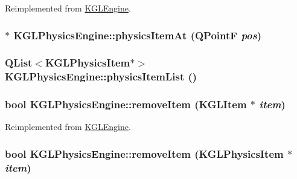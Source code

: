 Reimplemented from \hyperlink{class_k_g_l_engine_787e1d8dfb58a6d6973a1f62c83b3263}{KGLEngine}.\hypertarget{class_k_g_l_physics_engine_7ee68f8b014f5523f4ab1e9959ea2993}{
\subsubsection[{physicsItemAt}]{$\ast$ KGLPhysicsEngine::physicsItemAt (QPointF {\em pos})}}
\label{class_k_g_l_physics_engine_7ee68f8b014f5523f4ab1e9959ea2993}


\hypertarget{class_k_g_l_physics_engine_1024a6769903dc99982546d54fdd4a5e}{
\subsubsection[{physicsItemList}]{\setlength{\rightskip}{0pt plus 5cm}QList$<${\bf KGLPhysicsItem}$\ast$$>$ KGLPhysicsEngine::physicsItemList ()}}
\label{class_k_g_l_physics_engine_1024a6769903dc99982546d54fdd4a5e}


\hypertarget{class_k_g_l_physics_engine_c5e88c0ab7ec1923038fdcb36ffdb192}{
\subsubsection[{removeItem}]{\setlength{\rightskip}{0pt plus 5cm}bool KGLPhysicsEngine::removeItem ({\bf KGLItem} $\ast$ {\em item})}}
\label{class_k_g_l_physics_engine_c5e88c0ab7ec1923038fdcb36ffdb192}




Reimplemented from \hyperlink{class_k_g_l_engine_533f3324f67dcda39192365e2eab40c3}{KGLEngine}.\hypertarget{class_k_g_l_physics_engine_86b45678b02feaab807db096a260063a}{
\subsubsection[{removeItem}]{\setlength{\rightskip}{0pt plus 5cm}bool KGLPhysicsEngine::removeItem ({\bf KGLPhysicsItem} $\ast$ {\em item})}}
\label{class_k_g_l_physics_engine_86b45678b02feaab807db096a260063a}


